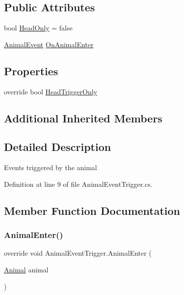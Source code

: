 \subsection*{Public Attributes}
\begin{DoxyCompactItemize}
\item 
bool \mbox{\hyperlink{class_animal_event_trigger_ad6c824d5bd40087af8d5310e2f6596ae}{Head\+Only}} = false
\item 
\mbox{\hyperlink{class_animal_event_trigger_1_1_animal_event}{Animal\+Event}} \mbox{\hyperlink{class_animal_event_trigger_a100c0ac522061547977fccac8a2d0c0a}{On\+Animal\+Enter}}
\end{DoxyCompactItemize}
\subsection*{Properties}
\begin{DoxyCompactItemize}
\item 
override bool \mbox{\hyperlink{class_animal_event_trigger_a5eac9fac285d9f0f549e6b2764ed1886}{Head\+Trigger\+Only}}
\end{DoxyCompactItemize}
\subsection*{Additional Inherited Members}


\subsection{Detailed Description}
Events triggered by the animal 



Definition at line 9 of file Animal\+Event\+Trigger.\+cs.



\subsection{Member Function Documentation}
\mbox{\label{class_animal_event_trigger_a99229b8cc15441fd184fb92747106d14}} 
\subsubsection{\texorpdfstring{Animal\+Enter()}{AnimalEnter()}}
{\footnotesize\ttfamily override void Animal\+Event\+Trigger.\+Animal\+Enter (\begin{DoxyParamCaption}\item[{\mbox{\hyperlink{class_animal}{Animal}}}]{animal }\end{DoxyParamCaption})\hspace{0.3cm}{\ttfamily [virtual]}}



